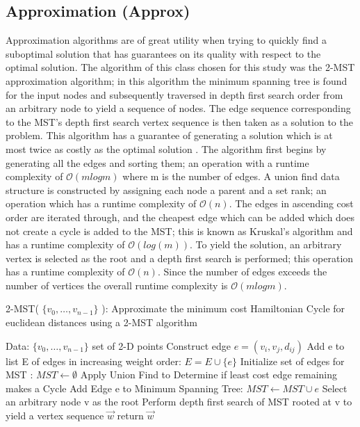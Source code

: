 \documentclass[format=sigconf]{acmart}
\begin{document}
\subsection{Approximation (Approx)}
Approximation algorithms are of great utility when trying to quickly find a suboptimal solution that has guarantees on its quality with respect to the optimal solution. The algorithm of this class chosen for this study was the 2-MST approximation algorithm; in this algorithm the minimum spanning tree is found for the input nodes and subsequently traversed in depth first search order from an arbitrary node to yield a sequence of nodes. The edge sequence corresponding to the MST's depth first search vertex sequence is then taken as a solution to the problem. This algorithm has a guarantee of generating a solution which is at most twice as costly as the optimal solution \cite{aa}. The algorithm first begins by generating all the edges and sorting them; an operation with a runtime complexity of $\mathcal{O}(mlogm)$ where m is the number of edges. A union find data structure is constructed by assigning each node a parent and a set rank; an operation which has a runtime complexity of $\mathcal{O}(n)$. The edges in ascending cost order are iterated through, and the cheapest edge which can be added which does not create a cycle is added to the MST; this is known as Kruskal's algorithm and has a runtime complexity of $\mathcal{O}(log(m))$. To yield the solution, an arbitrary vertex is selected as the root and a depth first search is performed; this operation has a runtime complexity of $\mathcal{O}(n)$. Since the number of edges exceeds the number of vertices the overall runtime complexity is $\mathcal{O}(mlogm)$.
\begin{algorithm}[H] 
	\caption{  2-MST( $\{v_0, \hdots, v_{n-1}\}$ ): Approximate the minimum cost Hamiltonian Cycle for euclidean distances using a 2-MST algorithm}
	\begin{algorithmic} 
		\STATE Data: $\{v_0, \hdots, v_{n-1}\}$ set of 2-D points
			\STATE Construct edge $e = (v_i, v_j, d_{ij})$
			\STATE Add e to list E of edges in increasing weight order: $E = E \cup \{e\}$
		\ENDFOR
		\STATE Initialize set of edges for MST : $MST \leftarrow \emptyset$
            \STATE Apply Union Find to Determine if least cost edge remaining makes a Cycle
                \STATE Add Edge e to Minimum Spanning Tree: $MST \leftarrow MST \cup e$
            \ENDIF
        \ENDWHILE
        \STATE Select an arbitrary node v as the root
        \STATE Perform depth first search of MST rooted at v to yield a vertex sequence $\vec{w}$
        \STATE return $\vec{w}$
	\end{algorithmic}
\end{algorithm}
\end{document}
